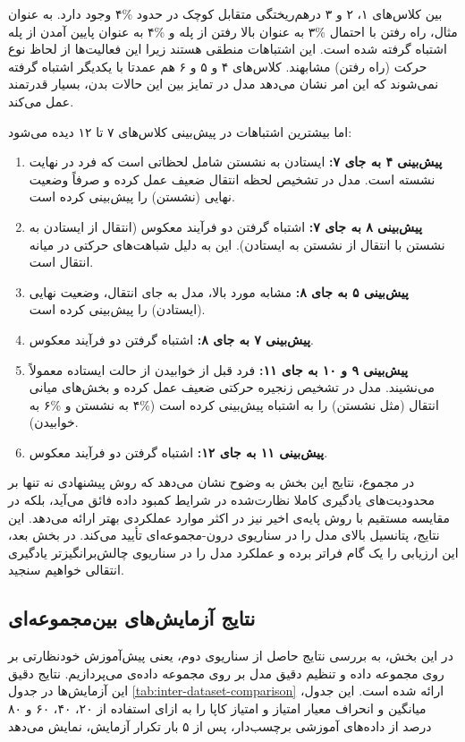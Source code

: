 بین کلاس‌های ۱، ۲ و ۳ درهم‌ریختگی متقابل کوچک در حدود \%۴ وجود دارد.
به عنوان مثال، راه رفتن با احتمال \%۳ به عنوان بالا رفتن از پله و \%۴ به عنوان پایین آمدن از پله اشتباه گرفته شده است. این اشتباهات منطقی هستند زیرا این فعالیت‌ها از لحاظ نوع حرکت (راه رفتن) مشابهند. کلاس‌های ۴ و ۵ و ۶ هم عمدتا با یکدیگر اشتباه گرفته نمی‌شوند که این امر نشان می‌دهد مدل در تمایز بین این حالات بدن، بسیار قدرتمند عمل می‌کند.

اما بیشترین اشتباهات در پیش‌بینی کلاس‌های ۷ تا ۱۲ دیده می‌شود:
\begin{enumerate}
    \item \textbf{پیش‌بینی ۴ به جای ۷:} ایستادن به نشستن شامل لحظاتی است که فرد در نهایت نشسته است. مدل در تشخیص لحظه انتقال ضعیف عمل کرده و صرفاً وضعیت نهایی (نشستن) را پیش‌بینی کرده است.
    \item \textbf{پیش‌بینی ۸ به جای ۷:} اشتباه گرفتن دو فرآیند معکوس (انتقال از ایستادن به نشستن با انتقال از نشستن به ایستادن). این به دلیل شباهت‌های حرکتی در میانه انتقال است.
    \item \textbf{پیش‌بینی ۵ به جای ۸:} مشابه مورد بالا، مدل به جای انتقال، وضعیت نهایی (ایستادن) را پیش‌بینی کرده است.
    \item \textbf{پیش‌بینی ۷ به جای ۸:} اشتباه گرفتن دو فرآیند معکوس.
    \item \textbf{پیش‌بینی ۹ و ۱۰ به جای ۱۱:} فرد قبل از خوابیدن از حالت ایستاده معمولاً می‌نشیند. مدل در تشخیص زنجیره حرکتی ضعیف عمل کرده و بخش‌های میانی انتقال (مثل نشستن) را به اشتباه پیش‌بینی کرده است (\%۴ به نشستن و \%۶ به خوابیدن).
    \item \textbf{پیش‌بینی ۱۱ به جای ۱۲:} اشتباه گرفتن دو فرآیند معکوس.
\end{enumerate}

در مجموع، نتایج این بخش به وضوح نشان می‌دهد که روش پیشنهادی نه تنها بر محدودیت‌های یادگیری کاملا نظارت‌شده در شرایط کمبود داده فائق می‌آید، بلکه در مقایسه مستقیم با روش پایه‌ی اخیر نیز در اکثر موارد عملکردی بهتر ارائه می‌دهد. این نتایج، پتانسیل بالای مدل را در سناریوی درون-مجموعه‌ای تأیید می‌کند. در بخش بعد، این ارزیابی را یک گام فراتر برده و عملکرد مدل را در سناریوی چالش‌برانگیزتر یادگیری انتقالی خواهیم سنجید.

\subsection{نتایج آزمایش‌های بین‌مجموعه‌ای}

در این بخش، به بررسی نتایج حاصل از سناریوی دوم، یعنی پیش‌آموزش خودنظارتی بر روی مجموعه داده  و تنظیم دقیق مدل بر روی مجموعه داده‌ی 
می‌پردازیم. نتایج دقیق این آزمایش‌ها در جدول
\ref{tab:inter-dataset-comparison}
ارائه شده است. این جدول، میانگین و انحراف معیار امتیاز
و امتیاز کاپا را به ازای استفاده از ۲۰، ۴۰، ۶۰ و ۸۰ درصد از داده‌های آموزشی برچسب‌دار، پس از ۵ بار تکرار آزمایش، نمایش می‌دهد


